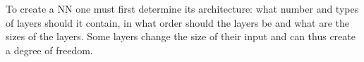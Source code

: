 \documentclass[../theses.tex]{subfiles}
\begin{document}



To create a NN one must first determine its architecture: what number and types of layers should it contain, in what order should the layers be and what are the sizes of the layers. Some layers change the size of their input and can thus create a degree of freedom. 

\end{document}
